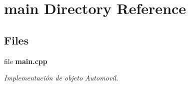 \section{main Directory Reference}
\label{dir_5c982d53a68cdbcd421152b4020263a9}
\subsection*{Files}
\begin{DoxyCompactItemize}
\item 
file {\bf main.\+cpp}
\begin{DoxyCompactList}\small\item\em Implementación de objeto Automovil. \end{DoxyCompactList}\end{DoxyCompactItemize}
